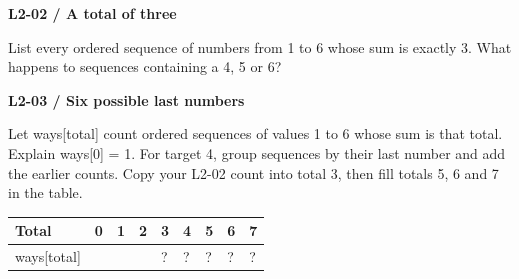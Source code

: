 \documentclass[11pt,a4paper]{article}
\begin{document}
\par\noindent\begin{minipage}{\linewidth}
\textbf{L2-02 / A total of three}\par\smallskip List every ordered sequence of numbers from 1 to 6 whose sum is exactly 3. What happens to sequences containing a 4, 5 or 6?\par
\end{minipage}\par\vspace{4mm}
\par\noindent\begin{minipage}{\linewidth}
\textbf{L2-03 / Six possible last numbers}\par\smallskip Let ways[total] count ordered sequences of values 1 to 6 whose sum is that total. Explain ways[0] = 1. For target 4, group sequences by their last number and add the earlier counts. Copy your L2-02 count into total 3, then fill totals 5, 6 and 7 in the table.\par
\par\medskip \begingroup\small\setlength{\tabcolsep}{4pt}\renewcommand{\arraystretch}{1.35}\begin{tabularx}{\linewidth}{>{\raggedright\arraybackslash}l>{\raggedright\arraybackslash}X>{\raggedright\arraybackslash}X>{\raggedright\arraybackslash}X>{\raggedright\arraybackslash}X>{\raggedright\arraybackslash}X>{\raggedright\arraybackslash}X>{\raggedright\arraybackslash}X>{\raggedright\arraybackslash}X}\toprule\textbf{Total} & \textbf{0} & \textbf{1} & \textbf{2} & \textbf{3} & \textbf{4} & \textbf{5} & \textbf{6} & \textbf{7}\\\midrule
ways[total] & 1 & 1 & 2 & ? & ? & ? & ? & ?\\
\bottomrule\end{tabularx}\endgroup\par\medskip 
\end{minipage}\par\vspace{4mm}
\end{document}
